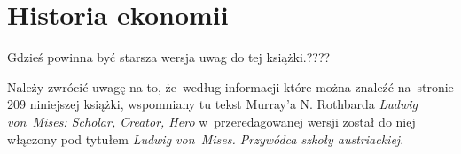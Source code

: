 \documentclass[a4paper,11pt]{article}
\begin{document}












\newpage

\section{Historia ekonomii}

\vspace{\spaceTwo}





\vspace{0em}



\vspace{0em}


Gdzieś powinna być starsza wersja uwag do tej książki.????

\vspace{\spaceFour}










\noindent
{} Należy zwrócić uwagę na to, że~według informacji które można
znaleźć na~stronie 209 niniejszej książki, wspomniany tu tekst Murray’a N.
Rothbarda \textit{Ludwig von~Mises: Scholar, Creator, Hero}
w~przeredagowanej wersji został do niej włączony pod tytułem \textit{Ludwig
  von~Mises. Przywódca szkoły austriackiej}.








\newpage

\end{document}
